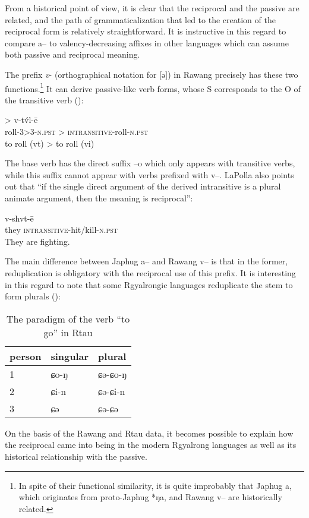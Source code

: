 \documentclass[oldfontcommands,oneside,a4paper,11pt]{memoir}
\newcommand{\ipa}[1]{{\phon #1}} %
\newcommand{\npst}{\textsc{n.pst}}
\begin{document}
From a historical point of view, it is clear that the reciprocal and the passive are related, and the path of grammaticalization that led to the creation of the reciprocal form is relatively straightforward. It is instructive in this regard to compare \ipa{a}-- to valency-decreasing affixes in other languages which can assume both passive and reciprocal meaning.

The prefix  \textit{v}- (orthographical notation for [ə]) in Rawang precisely has these two functions.\footnote{In spite of their functional similarity, it is quite improbably that Japhug \ipa{a}, which originates from proto-Japhug *ŋa, and Rawang \ipa{v}--  are historically related.} It can derive passive-like verb forms, whose S corresponds to the O of the transitive verb (\citealt[288]{lapolla01valency}):
\begin{exe}
\ex
\gll \ipa{tv́l-ò-ē} > 	\ipa{v-tv́l-ē} 	        \\
roll-3>3-\npst{} >  \textsc{intransitive}-roll-\npst{}  \\
 \glt  to roll (vt) >		to roll (vi)
\end{exe} 
The base verb has the direct suffix --\ipa{o} which only appears with transitive verbs, while this suffix cannot appear with verbs prefixed with \ipa{v}--. LaPolla also points out that ``if the single direct argument of the derived intransitive is a plural animate argument, then the meaning is reciprocal'':
\begin{exe}
\ex
\gll \ipa{àngmaq}  	\ipa{v-shvt-ē} 	        \\
 they		 \textsc{intransitive}-hit/kill-\npst{}  \\
 \glt  They are fighting.
\end{exe} 
 
 The main difference between Japhug \ipa{a}-- and Rawang \ipa{v}-- is that in the former, reduplication is obligatory with the reciprocal use of this prefix. It is interesting in this regard to note that some Rgyalrongic languages reduplicate the stem to form plurals (\citealt[29-30]{huangbf91daofu}):

\begin{table}[H]
\caption{The paradigm of the verb ``to go'' in Rtau}\label{tab:rtau} \centering
\begin{tabular}{lll} \toprule
person  & singular & plural\\
\midrule
1& \ipa{ɕo-ŋ} &	\ipa{ɕə-ɕo-ŋ} \\
2& \ipa{ɕi-n} &	\ipa{ɕə-ɕi-n} \\
3 & \ipa{ɕə} &	\ipa{ɕə-ɕə} \\ 
\bottomrule
\end{tabular}
\end{table}
On the basis of the Rawang and Rtau data, it becomes possible to explain how  the reciprocal came into being in the modern Rgyalrong languages as well as its historical relationship with the passive.
\end{document}
